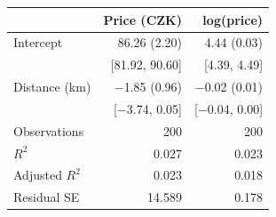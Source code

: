\begin{tabular}{lrr}
  \toprule
  & Price (CZK) & log(price) \\ 
  \midrule
Intercept & 86.26 (2.20) & 4.44 (0.03) \\ 
   & [81.92, 90.60] & [4.39, 4.49] \\ 
  Distance (km) & $-$1.85 (0.96) & $-$0.02 (0.01) \\ 
   & [$-$3.74, 0.05] & [$-$0.04, 0.00] \\ 
  Observations & 200 & 200 \\ 
  $R^2$ & 0.027 & 0.023 \\ 
  Adjusted $R^2$ & 0.023 & 0.018 \\ 
  Residual SE & 14.589 & 0.178 \\ 
   \bottomrule
\end{tabular}
